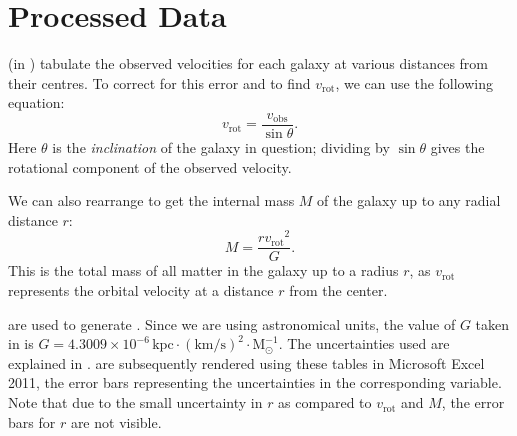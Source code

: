\documentclass{article}
\newcommand\solmass{\textrm{M}_\odot}
\newcommand\kpc{\textrm{kpc}}
\newcommand\kmps{\textrm{km}/\textrm{s}}
\newcommand\vrot{\ensuremath{v_{\textrm{rot}}}}
\newcommand\vobs{\ensuremath{v_{\textrm{obs}}}}
\begin{document}
\section{Processed Data}\label{sec:processed-data}


% 
% 


 (in ) tabulate the observed velocities for each galaxy at various distances from their centres.
To correct for this error and to find \(\vrot\), we can use the following equation:
\begin{equation}\label{eq:vrotfromvobs}
    \vrot = \frac{\vobs}{\sin\theta}.
\end{equation}
Here \(\theta\) is the \textit{inclination} of the galaxy in question; dividing by \(\sin\theta\) gives the rotational component of the observed velocity.

We can also rearrange  to get the internal mass \(M\) of the galaxy up to any radial distance \(r\):
\begin{equation}\label{eq:internalmass}
    M = \frac{r\vrot^2}{G}.
\end{equation}
This is the total mass of all matter in the galaxy up to a radius \(r\), as \(\vrot\) represents the orbital velocity at a distance \(r\) from the center.

 are used to generate .
Since we are using astronomical units, the value of \(G\) taken in  is \(G = 4.3009 \times 10^{-6} \, \kpc \cdot (\kmps)^2 \cdot \solmass^{-1}\).
The uncertainties used are explained in .
 are subsequently rendered using these tables in Microsoft Excel 2011, the error bars representing the uncertainties in the corresponding variable.
Note that due to the small uncertainty in \(r\) as compared to \(\vrot\) and \(M\), the error bars for \(r\) are not visible.
\end{document}
